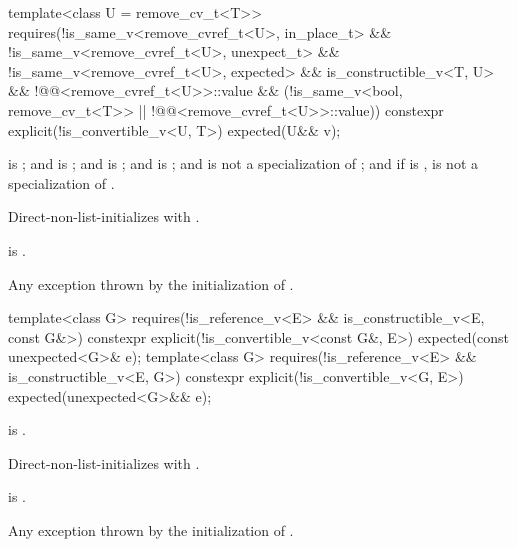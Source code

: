 %
\begin{itemdecl}
template<class U = remove_cv_t<T>>
  requires(!is_same_v<remove_cvref_t<U>, in_place_t> &&
           !is_same_v<remove_cvref_t<U>, unexpect_t> &&
           !is_same_v<remove_cvref_t<U>, expected> && is_constructible_v<T, U> &&
           !@@<remove_cvref_t<U>>::value &&
           (!is_same_v<bool, remove_cv_t<T>> ||
            !@@<remove_cvref_t<U>>::value))
constexpr explicit(!is_convertible_v<U, T>) expected(U&& v);
\end{itemdecl}

\begin{itemdescr}
\pnum
\constraints
{} is ; and  is ; and  is ; and  is ; and  is not a specialization of ; and if  is ,  is not a specialization of .

\pnum
\effects
Direct-non-list-initializes  with .

\pnum
\ensures
{} is .

\pnum
\throws
Any exception thrown by the initialization of .
\end{itemdescr}

%
\begin{itemdecl}
template<class G>
  requires(!is_reference_v<E> && is_constructible_v<E, const G&>)
constexpr explicit(!is_convertible_v<const G&, E>) expected(const unexpected<G>& e);
template<class G>
  requires(!is_reference_v<E> && is_constructible_v<E, G>)
constexpr explicit(!is_convertible_v<G, E>) expected(unexpected<G>&& e);
\end{itemdecl}

\begin{itemdescr}
\pnum
\constraints
{} is .

\pnum
\effects
Direct-non-list-initializes  with .

\pnum
\ensures
{} is .

\pnum
\throws
Any exception thrown by the initialization of .
\end{itemdescr}

